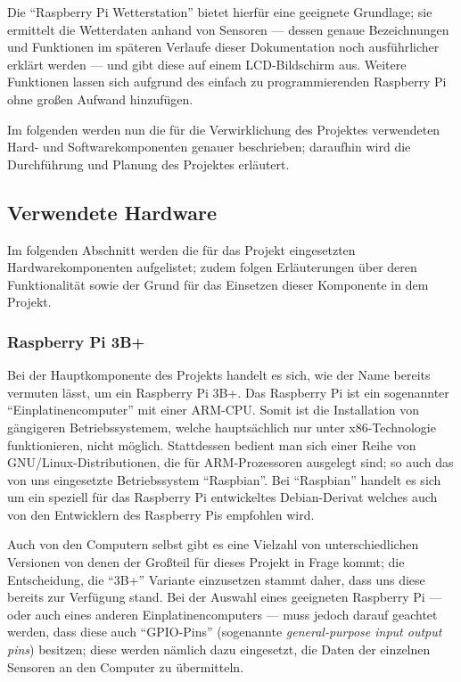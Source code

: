 \documentclass[a4paper,12pt]{article}
\begin{document}
Die "`Raspberry Pi Wetterstation"' bietet hierfür eine geeignete Grundlage; sie ermittelt die Wetterdaten anhand von Sensoren — dessen genaue Bezeichnungen und Funktionen im späteren Verlaufe dieser Dokumentation noch ausführlicher erklärt werden — und gibt diese auf einem LCD-Bildschirm aus. Weitere Funktionen lassen sich aufgrund des einfach zu programmierenden Raspberry Pi ohne großen Aufwand hinzufügen.

Im folgenden werden nun die für die Verwirklichung des Projektes verwendeten Hard- und Softwarekomponenten genauer beschrieben; daraufhin wird die Durchführung und Planung des Projektes erläutert.
\pagebreak

\subsection{Verwendete Hardware}
Im folgenden Abschnitt werden die für das Projekt eingesetzten Hardwarekomponenten aufgelistet; zudem folgen Erläuterungen über deren Funktionalität sowie der Grund für das Einsetzen dieser Komponente in dem Projekt.

\subsubsection{Raspberry Pi 3B+}
Bei der Hauptkomponente des Projekts handelt es sich, wie der Name bereits vermuten lässt, um ein Raspberry Pi 3B+.
Das Raspberry Pi ist ein sogenannter "`Einplatinencomputer"' mit einer ARM-CPU. Somit ist die Installation von gängigeren Betriebssystemem, welche hauptsächlich nur unter x86-Technologie funktionieren, nicht möglich. Stattdessen bedient man sich einer Reihe von GNU/Linux-Distributionen, die für ARM-Prozessoren ausgelegt sind; so auch das von uns eingesetzte Betriebssystem "`Raspbian"'. Bei "`Raspbian"' handelt es sich um ein speziell für das Raspberry Pi entwickeltes Debian-Derivat welches auch von den Entwicklern des Raspberry Pis empfohlen wird.

Auch von den Computern selbst gibt es eine Vielzahl von unterschiedlichen Versionen von denen der Großteil für dieses Projekt in Frage kommt; die Entscheidung, die "`3B+"' Variante einzusetzen stammt daher, dass uns diese bereits zur Verfügung stand. Bei der Auswahl eines geeigneten Raspberry Pi — oder auch eines anderen Einplatinencomputers — muss jedoch darauf geachtet werden, dass diese auch "`GPIO-Pins"' (sogenannte \textit{general-purpose input output pins}) besitzen; diese werden nämlich dazu eingesetzt, die Daten der einzelnen Sensoren an den Computer zu übermitteln.
\end{document}
